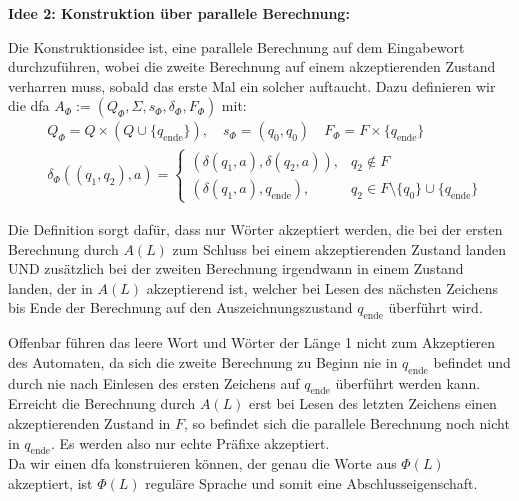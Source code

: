 \documentclass{article}
\begin{document}
\begin{enumerate}[a)]
	\textbf{Idee 2: Konstruktion über parallele Berechnung:}
	
	Die Konstruktionsidee ist, eine parallele Berechnung auf dem Eingabewort durchzuführen, wobei die zweite Berechnung auf einem akzeptierenden Zustand verharren muss, sobald das erste Mal ein solcher auftaucht. Dazu definieren wir die dfa $A_\Phi := (Q_\Phi, \Sigma, s_\Phi, \delta_\Phi, F_\Phi)$ mit:
	\begin{align}
		&Q_\Phi = Q \times (Q \cup \{q_\text{ende}\}),\quad s_\Phi = (q_0,q_0)\quad F_\Phi = F \times \{q_\text{ende}\}\\
		&\delta_\Phi((q_1,q_2),a) = \begin{cases}
		(\delta(q_1,a),\delta(q_2,a)), &q_2 \not\in F\\
		(\delta(q_1,a),q_\text{ende}), &q_2 \in F\setminus\{ q_0\} \cup\{q_\text{ende}\}
		\end{cases}
	\end{align}
	
	Die Definition sorgt dafür, dass nur Wörter akzeptiert werden, die bei der ersten Berechnung durch $A(L)$ zum Schluss bei einem akzeptierenden Zustand landen UND zusätzlich bei der zweiten Berechnung irgendwann in einem Zustand landen, der in $A(L)$ akzeptierend ist, welcher bei Lesen des nächsten Zeichens bis Ende der Berechnung auf den Auszeichnungszustand $q_\text{ende}$ überführt wird.
	
	Offenbar führen das leere Wort und Wörter der Länge 1 nicht zum Akzeptieren des Automaten, da sich die zweite Berechnung zu Beginn nie in $q_\text{ende}$ befindet und durch nie nach Einlesen des ersten Zeichens auf $q_\text{ende}$ überführt werden kann. Erreicht die Berechnung durch $A(L)$ erst bei Lesen des letzten Zeichens einen akzeptierenden Zustand in $F$, so befindet sich die parallele Berechnung noch nicht in $q_\text{ende}$. Es werden also nur echte Präfixe akzeptiert.\\
	
	
	Da wir einen dfa konstruieren können, der genau die Worte aus $\Phi(L)$ akzeptiert, ist $\Phi(L)$ reguläre Sprache und somit eine Abschlusseigenschaft.
\end{enumerate}
\end{document}
